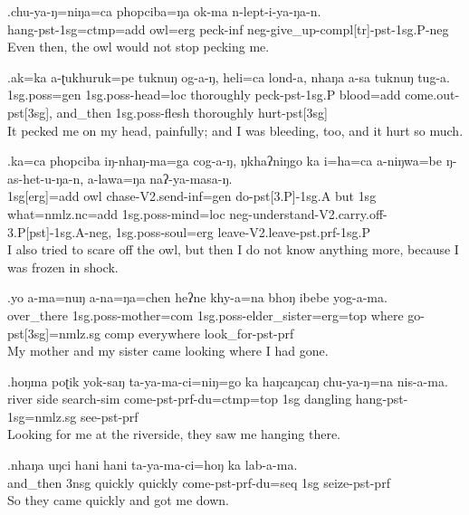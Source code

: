 \exg.chu-ya-ŋ=niŋa=ca                    phopciba=ŋa   ok-ma      n-lept-i-ya-ŋa-n.\\
 hang{\sc -pst-1sg=ctmp=add} owl{\sc =erg} peck{\sc -inf} {\sc neg-}give\_up{\sc -compl[tr]-pst-1sg.P-neg}\\
Even then, the owl would not stop pecking me.

\exg.ak=ka          a-ʈukhuruk=pe            tuknuŋ    og-a-ŋ, heli=ca         lond-a, nhaŋa   a-sa             tuknuŋ    tug-a.\\
 {\sc 1sg.poss=gen} {\sc 1sg.poss-}head{\sc =loc} thoroughly peck{\sc -pst-1sg.P} blood{\sc =add} come.out{\sc -pst[3sg],} and\_then {\sc 1sg.poss-}flesh thoroughly hurt{\sc -pst[3sg]}\\
It pecked me on my head, painfully; and I was bleeding, too, and it hurt so much.


\exg.ka=ca              phopciba iŋ-nhaŋ-ma=ga             cog-a-ŋ, ŋkhaʔniŋgo ka  i=ha=ca                       a-niŋwa=be             ŋ-as-het-u-ŋa-n, a-lawa=ŋa                  naʔ-ya-masa-ŋ.\\
 {\sc 1sg[erg]=add} owl      chase{\sc -V2.send-inf=gen} do{\sc -pst[3.P]-1sg.A} but           {\sc 1sg} what{\sc =nmlz.nc=add} {\sc 1sg.poss-}mind{\sc =loc} {\sc neg-}understand{\sc -V2.carry.off-3.P[pst]-1sg.A-neg,} {\sc 1sg.poss-}soul{\sc =erg} leave{\sc -V2.leave-pst.prf-1sg.P}\\
I also tried to scare off the owl, but then I do not know anything more, because I was frozen in shock.


\exg.yo         a-ma=nuŋ      a-na=ŋa=chen      heʔne khy-a=na       bhoŋ ibebe     yog-a-ma.\\
 over\_there {\sc 1sg.poss-}mother{\sc =com}  {\sc 1sg.poss-}elder\_sister{\sc =erg=top}  where  go{\sc -pst[3sg]=nmlz.sg} comp  everywhere look\_for{\sc -pst-prf}\\
My mother and my sister came looking where I had gone.


\exg.hoŋma poʈik yok-saŋ         ta-ya-ma-ci=niŋ=go                  ka  haŋcaŋcaŋ chu-ya-ŋ=na                  nis-a-ma.\\
 river  side   search{\sc -sim} come{\sc -pst-prf-du=ctmp=top}  {\sc 1sg} dangling     hang{\sc -pst-1sg=nmlz.sg} see{\sc -pst-prf}\\
Looking for me at the riverside, they saw me hanging there.

\exg.nhaŋa   uŋci hani    hani    ta-ya-ma-ci=hoŋ             ka  lab-a-ma.\\
 and\_then {\sc 3nsg}  quickly quickly come{\sc -pst-prf-du=seq} {\sc 1sg} seize{\sc -pst-prf}\\
So they came quickly and got me down.

